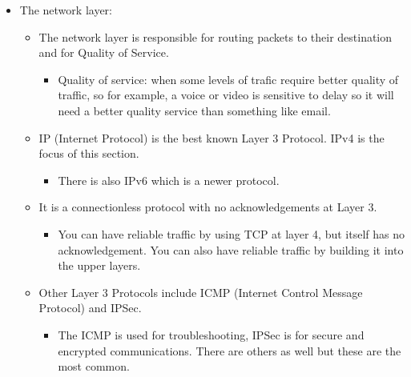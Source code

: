 \begin{itemize}
    \item The network layer:
        \begin{itemize}
            \item The network layer is responsible for routing packets to their destination and for Quality of Service.
                \begin{itemize}
                    \item Quality of service: when some levels of trafic require better quality of traffic, so for example, a voice or video is sensitive to delay so it will need a better quality service than something like email.
                \end{itemize}
            \item IP (Internet Protocol) is the best known Layer 3 Protocol. IPv4 is the focus of this section.
                \begin{itemize}
                    \item There is also IPv6 which is a newer protocol.
                \end{itemize}
            \item It is a connectionless protocol with no acknowledgements at Layer 3.
                \begin{itemize}
                    \item You can have reliable traffic by using TCP at layer 4, but itself has no acknowledgement. You can also have reliable traffic by building it into the upper layers.
                \end{itemize}
            \item Other Layer 3 Protocols include ICMP (Internet Control Message Protocol) and IPSec.
                \begin{itemize}
                    \item The ICMP is used for troubleshooting, IPSec is for secure and encrypted communications. There are others as well but these are the most common.
                \end{itemize}
        \end{itemize}
    

\end{itemize}
